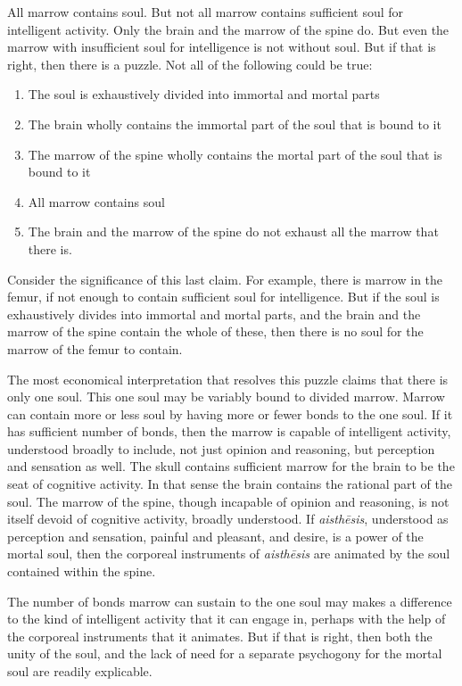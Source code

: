 All marrow contains soul. But not all marrow contains sufficient soul for intelligent activity. Only the brain and the marrow of the spine do. But even the marrow with insufficient soul for intelligence is not without soul. But if that is right, then there is a puzzle. Not all of the following could be true:
\begin{enumerate}[(1)]
	\item The soul is exhaustively divided into immortal and mortal parts
	\item The brain wholly contains the immortal part of the soul that is bound to it
	\item The marrow of the spine wholly contains the mortal part of the soul that is bound to it
	\item All marrow contains soul
	\item The brain and the marrow of the spine do not exhaust all the marrow that there is.
\end{enumerate}
Consider the significance of this last claim. For example, there is marrow in the femur, if not enough to contain sufficient soul for intelligence. But if the soul is exhaustively divides into immortal and mortal parts, and the brain and the marrow of the spine contain the whole of these, then there is no soul for the marrow of the femur to contain.

The most economical interpretation that resolves this puzzle claims that there is only one soul. This one soul may be variably bound to divided marrow. Marrow can contain more or less soul by having more or fewer bonds to the one soul. If it has sufficient number of bonds, then the marrow is capable of intelligent activity, understood broadly to include, not just opinion and reasoning, but perception and sensation as well. The skull contains sufficient marrow for the brain to be the seat of cognitive activity. In that sense the brain contains the rational part of the soul. The marrow of the spine, though incapable of opinion and reasoning, is not itself devoid of cognitive activity, broadly understood. If \emph{aisthēsis}, understood as perception and sensation, painful and pleasant, and desire, is a power of the mortal soul, then the corporeal instruments of \emph{aisthēsis} are animated by the soul contained within the spine. 

The number of bonds marrow can sustain to the one soul may makes a difference to the kind of intelligent activity that it can engage in, perhaps with the help of the corporeal instruments that it animates. But if that is right, then both the unity of the soul, and the lack of need for a separate psychogony for the mortal soul are readily explicable.

